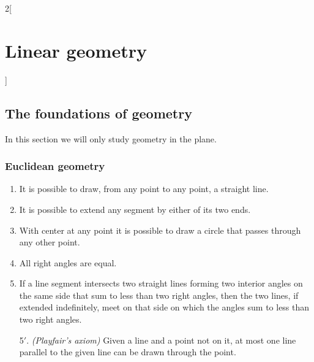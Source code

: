 \documentclass[class=article,10pt,crop=false]{standalone}
\begin{document}
\begin{multicols}{2}[\section{Linear geometry}]
\subsection{The foundations of geometry}
In this section we will only study geometry in the plane.
\subsubsection*{Euclidean geometry}
\begin{axiom}
\hfill
    \begin{enumerate}
    \item It is possible to draw, from any point to any point, a straight line.
    \item It is possible to extend any segment by either of its two ends. 
    \item With center at any point it is possible to draw a circle that passes through any other point. 
    \item All right angles are equal.
    \item If a line segment intersects two straight lines forming two interior angles on the same side that sum to less than two right angles, then the two lines, if extended indefinitely, meet on that side on which the angles sum to less than two right angles.
    \item[5$'$.] \textit{(Playfair's axiom)} Given a line and a point not on it, at most one line parallel to the given line can be drawn through the point.
\end{enumerate}
\end{axiom}

\end{multicols}
\end{document}
